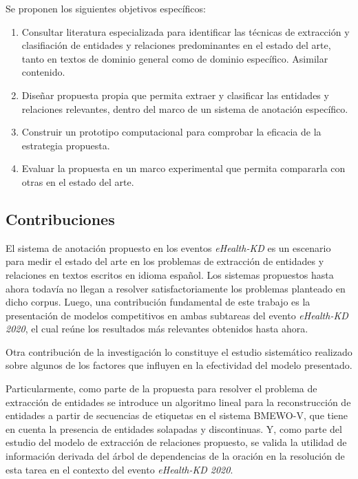 Se proponen los siguientes objetivos específicos:

\begin{enumerate}
	\item Consultar literatura especializada para identificar las técnicas de extracción y clasifiación de entidades y relaciones predominantes en el estado del arte, tanto en textos de dominio general como de dominio específico. Asimilar contenido.
	
	\item Diseñar propuesta propia que permita extraer y clasificar las entidades y relaciones relevantes, dentro del marco de un sistema de anotación específico.
	
	\item Construir un prototipo computacional para comprobar la eficacia de la estrategia propuesta.
	
	\item Evaluar la propuesta en un marco experimental que permita compararla con otras en el estado del arte.
	
\end{enumerate}

\subsection*{Contribuciones}

El sistema de anotación propuesto en los eventos \textit{eHealth-KD} es un escenario para medir el estado del arte en los problemas de extracción de entidades y relaciones en textos escritos en idioma español.
Los sistemas propuestos hasta ahora todavía no llegan a resolver satisfactoriamente los problemas planteado en dicho corpus.
Luego, una contribución fundamental de este trabajo es la presentación de modelos competitivos en ambas subtareas del evento \textit{eHealth-KD 2020}, el cual reúne los resultados más relevantes obtenidos hasta ahora.

Otra contribución de la investigación lo constituye el estudio sistemático realizado sobre algunos de los factores que influyen en la efectividad del modelo presentado.

Particularmente, como parte de la propuesta para resolver el problema de extracción de entidades se introduce un algoritmo lineal para la reconstrucción de entidades a partir de secuencias de etiquetas en el sistema BMEWO-V, que tiene en cuenta la presencia de entidades solapadas y discontinuas.
Y, como parte del estudio del modelo de extracción de relaciones propuesto, se valida la utilidad de información derivada del árbol de dependencias de la oración en la resolución de esta tarea en el contexto del evento \textit{eHealth-KD 2020}.

